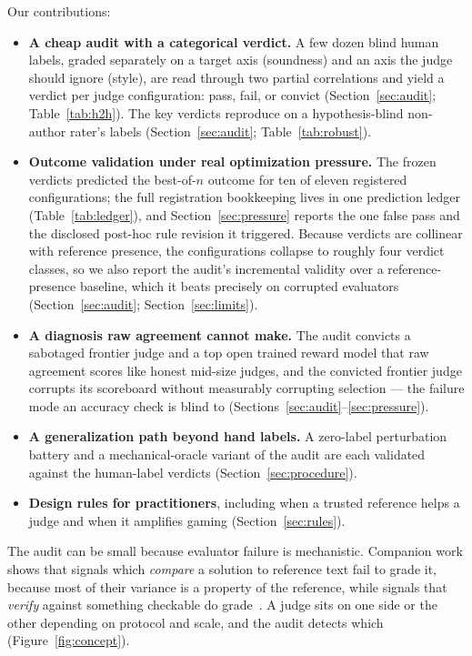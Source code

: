 Our contributions:
\begin{itemize}
\item \textbf{A cheap audit with a categorical verdict.} A few dozen blind human labels, graded separately on a target axis (soundness) and an axis the judge should ignore (style), are read through two partial correlations and yield a verdict per judge configuration: pass, fail, or convict (Section~\ref{sec:audit}; Table~\ref{tab:h2h}).
The key verdicts reproduce on a hypothesis-blind non-author rater's labels (Section~\ref{sec:audit}; Table~\ref{tab:robust}).
\item \textbf{Outcome validation under real optimization pressure.} The frozen verdicts predicted the best-of-$n$ outcome for ten of eleven registered configurations; the full registration bookkeeping lives in one prediction ledger (Table~\ref{tab:ledger}), and Section~\ref{sec:pressure} reports the one false pass and the disclosed post-hoc rule revision it triggered.
Because verdicts are collinear with reference presence, the configurations collapse to roughly four verdict classes, so we also report the audit's incremental validity over a reference-presence baseline, which it beats precisely on corrupted evaluators (Section~\ref{sec:audit}; Section~\ref{sec:limits}).
\item \textbf{A diagnosis raw agreement cannot make.} The audit convicts a sabotaged frontier judge and a top open trained reward model that raw agreement scores like honest mid-size judges, and the convicted frontier judge corrupts its scoreboard without measurably corrupting selection --- the failure mode an accuracy check is blind to (Sections~\ref{sec:audit}--\ref{sec:pressure}).
\item \textbf{A generalization path beyond hand labels.} A zero-label perturbation battery and a mechanical-oracle variant of the audit are each validated against the human-label verdicts (Section~\ref{sec:procedure}).
\item \textbf{Design rules for practitioners}, including when a trusted reference helps a judge and when it amplifies gaming (Section~\ref{sec:rules}).
\end{itemize}

The audit can be small because evaluator failure is mechanistic.
Companion work shows that signals which \emph{compare} a solution to reference text fail to grade it, because most of their variance is a property of the reference, while signals that \emph{verify} against something checkable do grade~\cite{companionB}.
A judge sits on one side or the other depending on protocol and scale, and the audit detects which (Figure~\ref{fig:concept}).


